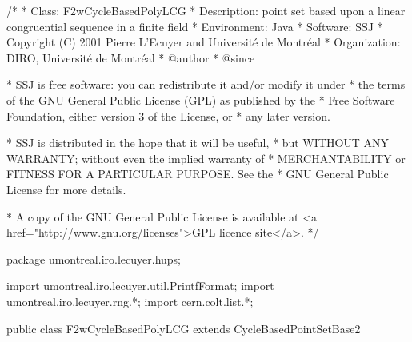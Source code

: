 \begin{code}
\begin{hide}
/*
 * Class:        F2wCycleBasedPolyLCG
 * Description:  point set based upon a linear congruential sequence in a
                 finite field
 * Environment:  Java
 * Software:     SSJ 
 * Copyright (C) 2001  Pierre L'Ecuyer and Université de Montréal
 * Organization: DIRO, Université de Montréal
 * @author       
 * @since

 * SSJ is free software: you can redistribute it and/or modify it under
 * the terms of the GNU General Public License (GPL) as published by the
 * Free Software Foundation, either version 3 of the License, or
 * any later version.

 * SSJ is distributed in the hope that it will be useful,
 * but WITHOUT ANY WARRANTY; without even the implied warranty of
 * MERCHANTABILITY or FITNESS FOR A PARTICULAR PURPOSE.  See the
 * GNU General Public License for more details.

 * A copy of the GNU General Public License is available at
   <a href="http://www.gnu.org/licenses">GPL licence site</a>.
 */
\end{hide}
package umontreal.iro.lecuyer.hups; \begin{hide}
import umontreal.iro.lecuyer.util.PrintfFormat;
import umontreal.iro.lecuyer.rng.*;
import cern.colt.list.*;
\end{hide}


public class F2wCycleBasedPolyLCG extends CycleBasedPointSetBase2 \begin{hide} {

   private F2wStructure param;
\end{hide}\end{code}


